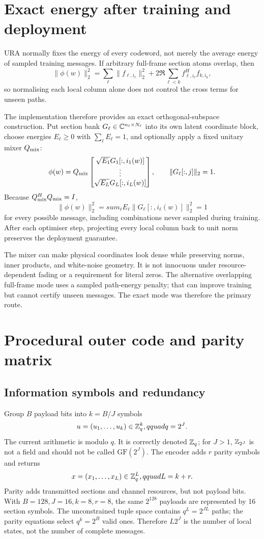 \documentclass[11pt]{article}
\begin{document}
\section{Exact energy after training and deployment}

URA normally fixes the energy of every codeword, not merely the average energy of sampled training messages. If
arbitrary full-frame section atoms overlap, then
\[
 \|\phi(w)\|_2^2=\sum_\ell\|f_{\ell,i_\ell}\|_2^2
 +2\Re\sum_{\ell<k}f_{\ell,i_\ell}^Hf_{k,i_k},
\]
so normalising each local column alone does not control the cross terms for unseen paths.

The implementation therefore provides an exact orthogonal-subspace construction. Put section bank
$G_\ell\in\mathbb{C}^{n_\ell\times N_\ell}$ into its own latent coordinate block, choose energies $E_\ell\ge0$ with
$\sum_\ell E_\ell=1$, and optionally apply a fixed unitary mixer $Q_{\rm mix}$:
\[
 \phi(w)=Q_{\rm mix}
 \begin{bmatrix}
 \sqrt{E_1}G_1[:,i_1(w)]\\ \vdots\\ \sqrt{E_L}G_L[:,i_L(w)]
 \end{bmatrix},
 \qquad \|G_\ell[:,j]\|_2=1.
\]
Because $Q_{\rm mix}^HQ_{\rm mix}=I$,
\[
 \|\phi(w)\|_2^2=sum_\ell E_\ell\|G_\ell[:,i_\ell(w)]\|_2^2=1
\]
for every possible message, including combinations never sampled during training. After each optimiser step, projecting
every local column back to unit norm preserves the deployment guarantee.

The mixer can make physical coordinates look dense while preserving norms, inner products, and white-noise geometry.
It is not innocuous under resource-dependent fading or a requirement for literal zeros. The alternative overlapping
full-frame mode uses a sampled path-energy penalty; that can improve training but cannot certify unseen messages. The
exact mode was therefore the primary route.

\section{Procedural outer code and parity matrix}

\subsection{Information symbols and redundancy}

Group $B$ payload bits into $k=B/J$ symbols
\[
 u=(u_1,\ldots,u_k)\in\mathbb{Z}_q^k,qquad q=2^J.
\]
The current arithmetic is modulo $q$. It is correctly denoted $\mathbb{Z}_q$; for $J>1$, $\mathbb{Z}_{2^J}$ is not a field and should
not be called $\mathrm{GF}(2^J)$. The encoder adds $r$ parity symbols and returns
\[
 x=(x_1,\ldots,x_L)\in\mathbb{Z}_q^L,qquad L=k+r.
\]
Parity adds transmitted sections and channel resources, but not payload bits. With $B=128,J=16,k=8,r=8$, the same
$2^{128}$ payloads are represented by 16 section symbols. The unconstrained tuple space contains
$q^L=2^{JL}$ paths; the parity equations select $q^k=2^B$ valid ones. Therefore $L2^J$ is the number of local states,
not the number of complete messages.
\end{document}
